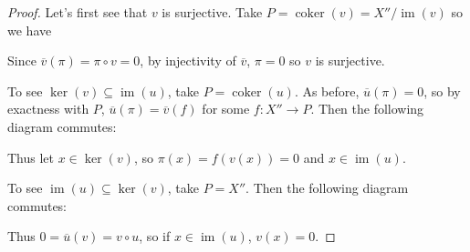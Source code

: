 \documentclass[11pt, a4paper]{memoir}
\theoremstyle{change}
\theoremstyle{plain}
\theoremstyle{nonumberplain}
\newtheorem{proof}{Proof}
\DeclareMathOperator{\coker}{coker}
\DeclareMathOperator{\id}{id}
\DeclareMathOperator{\im}{im}
\numberwithin{equation}{section}
\begin{document}
\begin{proof}
    Let's first see that $v$ is surjective.
    Take $P=\coker(v)=X''/\im(v)$ so we have
    \begin{center}
    \end{center}
    Since $\overline{v}(\pi)=\pi\circ v=0$, by injectivity of $\overline{v}$, $\pi=0$ so $v$ is surjective.

    To see $\ker(v)\subseteq\im(u)$, take $P=\coker(u)$.
    As before, $\overline{u}(\pi)=0$, so by exactness with $P$, $\overline{u}(\pi)=\overline{v}(f)$ for some $f:X''\to P$.
    Then the following diagram commutes:
    \begin{center}
    \end{center}
    Thus let $x\in\ker(v)$, so $\pi(x)=f(v(x))=0$ and $x\in\im(u)$.

    To see $\im(u)\subseteq\ker(v)$, take $P=X''$.
    Then the following diagram commutes:
    \begin{center}
    \end{center}
    Thus $0=\overline{u}(v)=v\circ u$, so if $x\in\im(u)$, $v(x)=0$.
\end{proof}
\end{document}
